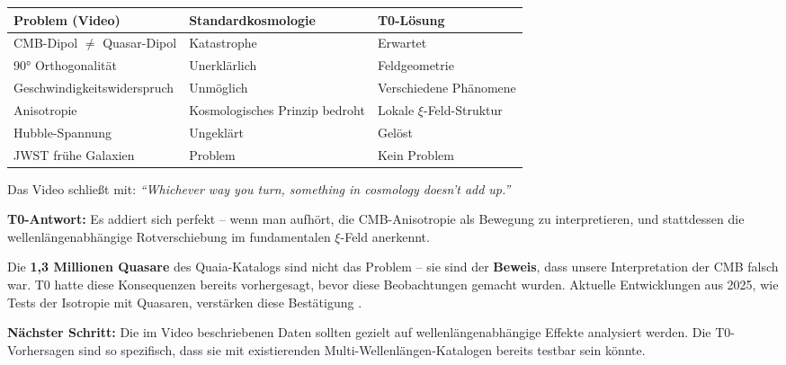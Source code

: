 \documentclass{article}
\begin{document}
	\begin{tabular}{p{3.5cm}|p{6cm}|p{5.5cm}}
		\textbf{Problem (Video)} & \textbf{Standardkosmologie} & \textbf{T0-Lösung} \\
		\hline
		CMB-Dipol $\neq$ Quasar-Dipol & Katastrophe \cite{mittal2024} & Erwartet \\
		90° Orthogonalität & Unerklärlich \cite{secrest2024} & Feldgeometrie \\
		Geschwindigkeitswiderspruch & Unmöglich & Verschiedene Phänomene \\
		Anisotropie & Kosmologisches Prinzip bedroht & Lokale $\xi$-Feld-Struktur \\
		Hubble-Spannung & Ungeklärt & Gelöst \\
		JWST frühe Galaxien & Problem & Kein Problem \\
	\end{tabular}
	
	Das Video schließt mit: \textit{``Whichever way you turn, something in cosmology doesn't add up.''}
	
	\textbf{T0-Antwort:} Es addiert sich perfekt -- wenn man aufhört, die CMB-Anisotropie als Bewegung zu interpretieren, und stattdessen die wellenlängenabhängige Rotverschiebung im fundamentalen $\xi$-Feld anerkennt.
	
	Die \textbf{1,3 Millionen Quasare} des Quaia-Katalogs sind nicht das Problem -- sie sind der \textbf{Beweis}, dass unsere Interpretation der CMB falsch war. T0 hatte diese Konsequenzen bereits vorhergesagt, bevor diese Beobachtungen gemacht wurden. Aktuelle Entwicklungen aus 2025, wie Tests der Isotropie mit Quasaren, verstärken diese Bestätigung \cite{sarkar2025}.
	
	\textbf{Nächster Schritt:} Die im Video beschriebenen Daten sollten gezielt auf wellenlängenabhängige Effekte analysiert werden. Die T0-Vorhersagen sind so spezifisch, dass sie mit existierenden Multi-Wellenlängen-Katalogen bereits testbar sein könnte.
	
\end{document}
